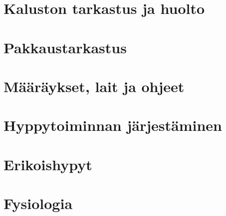 \documentclass[10pt,twoside,openany,hidelinks]{memoir}
\begin{document}
\chapter{Kaluston tarkastus ja huolto}
\label{kaluston-tarkastus-ja-huolto}
\thispagestyle{headings}
\begin{multicols}{2}
\end{multicols}

\chapter{Pakkaustarkastus}
\label{pakkaustarkastus}
\thispagestyle{headings}
\begin{multicols}{2}
\end{multicols}

\chapter{Määräykset, lait ja ohjeet}
\label{maaraykset-lait-ja-ohjeet}
\thispagestyle{headings}
\begin{multicols}{2}
\end{multicols}

\chapter{Hyppytoiminnan järjestäminen}
\label{hyppytoiminnan-jarjestaminen}
\thispagestyle{headings}
\begin{multicols}{2}
\end{multicols}

\chapter{Erikoishypyt}
\label{erikoishypyt}
\thispagestyle{headings}
\begin{multicols}{2}
\end{multicols}

\chapter{Fysiologia}
\label{fysiologia}
\thispagestyle{headings}
\begin{multicols}{2}
\end{multicols}
\end{document}
